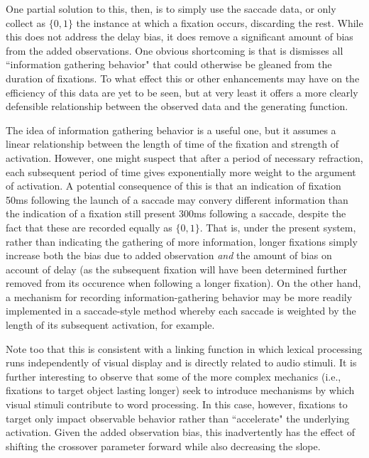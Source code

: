 \documentclass{article}
\begin{document}
One partial solution to this, then, is to simply use the saccade data, or only collect as $\{0,1\}$ the instance at which a fixation occurs, discarding the rest. While this does not address the delay bias, it does remove a significant amount of bias from the added observations. One obvious shortcoming is that is dismisses all ``information gathering behavior" that could otherwise be gleaned from the duration of fixations. To what effect this or other enhancements may have on the efficiency of this data are yet to be seen, but at very least it offers a more clearly defensible relationship between the observed data and the generating function.

The idea of information gathering behavior is a useful one, but it assumes a linear relationship between the length of time of the fixation and strength of activation. However, one might suspect that after a period of necessary refraction, each subsequent period of time gives exponentially more weight to the argument of activation. A potential consequence of this is that an indication of fixation 50ms following the launch of a saccade may convery different information than the indication of a fixation still present 300ms following a saccade, despite the fact that these are recorded equally as $\{0,1\}$. That is, under the present system, rather than indicating the gathering of more information, longer fixations simply increase both the bias due to added observation \textit{and} the amount of bias on account of delay (as the subsequent fixation will have been determined further removed from its occurence when following a longer fixation). On the other hand, a mechanism for recording information-gathering behavior may be more readily implemented in a saccade-style method whereby each saccade is weighted by the length of its subsequent activation, for example.

Note too that this is consistent with a linking function in which lexical processing runs independently of visual display and is directly related to audio stimuli. It is further interesting to observe that some of the more complex mechanics (i.e., fixations to target object lasting longer) seek to introduce mechanisms by which visual stimuli contribute to word processing. In this case, however, fixations to target only impact observable behavior rather than ``accelerate" the underlying activation. Given the added observation bias, this inadvertently has the effect of shifting the crossover parameter forward while also decreasing the slope.
\end{document}
